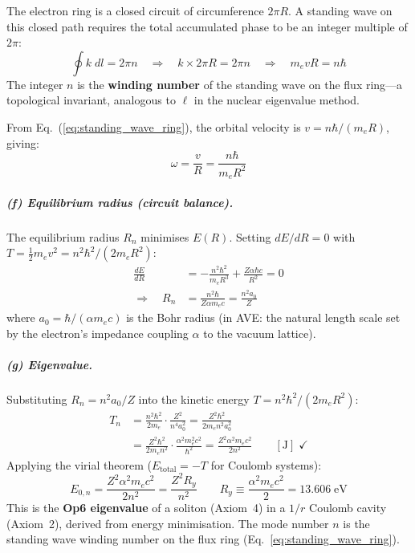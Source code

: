 The electron ring is a closed circuit of circumference $2\pi R$.
A standing wave on this closed path requires the total
accumulated phase to be an integer multiple of $2\pi$:
\begin{equation}
    \oint k\;dl = 2\pi n
    \quad\Longrightarrow\quad
    k \times 2\pi R = 2\pi n
    \quad\Longrightarrow\quad
    m_e v R = n\hbar
    \label{eq:standing_wave_ring}
\end{equation}
The integer $n$ is the \textbf{winding number} of the
standing wave on the flux ring---a topological invariant,
analogous to $\ell$ in the nuclear eigenvalue method.

From Eq.~(\ref{eq:standing_wave_ring}), the orbital velocity
is $v = n\hbar/(m_e R)$, giving:
\begin{equation}
    \omega = \frac{v}{R} = \frac{n\hbar}{m_e R^2}
    \label{eq:omega_from_n}
\end{equation}

\subparagraph{(f) Equilibrium radius (circuit balance).}
The equilibrium radius $R_n$ minimises $E(R)$.  Setting
$dE/dR = 0$ with $T = \tfrac{1}{2}m_e v^2 = n^2\hbar^2/(2m_e R^2)$:
\begin{align}
    \frac{dE}{dR}
    &= -\frac{n^2\hbar^2}{m_e R^3}
    + \frac{Z\alpha\hbar c}{R^2} = 0
    \nonumber \\
    \Longrightarrow\quad
    R_n &= \frac{n^2 \hbar}{Z \alpha m_e c}
    = \frac{n^2 a_0}{Z}
    \label{eq:R_equilibrium}
\end{align}
where $a_0 = \hbar/(\alpha m_e c)$ is the Bohr radius
(in AVE: the natural length scale set by the electron's
impedance coupling $\alpha$ to the vacuum lattice).

\subparagraph{(g) Eigenvalue.}
Substituting $R_n = n^2 a_0 / Z$ into the kinetic
energy $T = n^2\hbar^2/(2m_e R^2)$:
\begin{align}
    T_n &= \frac{n^2 \hbar^2}{2 m_e}
    \cdot \frac{Z^2}{n^4 a_0^2}
    = \frac{Z^2 \hbar^2}{2 m_e n^2 a_0^2}
    \nonumber \\
    &= \frac{Z^2 \hbar^2}{2 m_e n^2}
    \cdot \frac{\alpha^2 m_e^2 c^2}{\hbar^2}
    = \frac{Z^2 \alpha^2 m_e c^2}{2 n^2}
    \qquad [\text{J}]\;\checkmark
\end{align}
Applying the virial theorem ($E_{\text{total}} = -T$
for Coulomb systems):
\begin{equation}
    \boxed{E_{0,n}
    = \frac{Z^2 \alpha^2 m_e c^2}{2 n^2}
    = \frac{Z^2 R_y}{n^2}}
    \qquad R_y \equiv \frac{\alpha^2 m_e c^2}{2}
    = 13.606\;\text{eV}
    \label{eq:E0_eigenvalue}
\end{equation}
This is the \textbf{Op6 eigenvalue} of a soliton
(Axiom~4) in a $1/r$ Coulomb cavity (Axiom~2),
derived from energy minimisation.  The mode number
$n$ is the standing wave winding number on the
flux ring (Eq.~\ref{eq:standing_wave_ring}).

